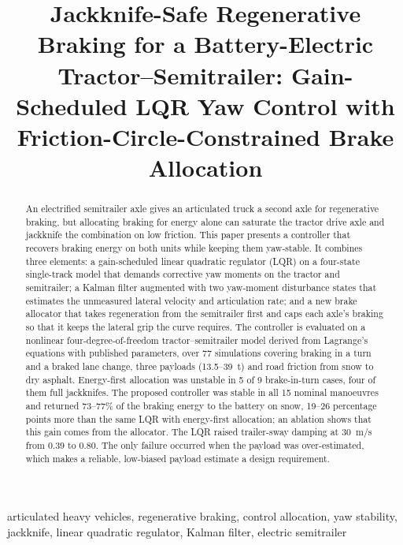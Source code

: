 \documentclass[conference]{IEEEtran}
\begin{document}
\title{Jackknife-Safe Regenerative Braking for a Battery-Electric Tractor--Semitrailer: Gain-Scheduled LQR Yaw Control with Friction-Circle-Constrained Brake Allocation}

\author{
}

\maketitle

\begin{abstract}
An electrified semitrailer axle gives an articulated truck a second axle for regenerative braking, but allocating braking for energy alone can saturate the tractor drive axle and jackknife the combination on low friction. This paper presents a controller that recovers braking energy on both units while keeping them yaw-stable. It combines three elements: a gain-scheduled linear quadratic regulator (LQR) on a four-state single-track model that demands corrective yaw moments on the tractor and semitrailer; a Kalman filter augmented with two yaw-moment disturbance states that estimates the unmeasured lateral velocity and articulation rate; and a new brake allocator that takes regeneration from the semitrailer first and caps each axle's braking so that it keeps the lateral grip the curve requires. The controller is evaluated on a nonlinear four-degree-of-freedom tractor--semitrailer model derived from Lagrange's equations with published parameters, over 77 simulations covering braking in a turn and a braked lane change, three payloads (13.5--39~t) and road friction from snow to dry asphalt. Energy-first allocation was unstable in 5 of 9 brake-in-turn cases, four of them full jackknifes. The proposed controller was stable in all 15 nominal manoeuvres and returned 73--77\% of the braking energy to the battery on snow, 19--26 percentage points more than the same LQR with energy-first allocation; an ablation shows that this gain comes from the allocator. The LQR raised trailer-sway damping at 30~m/s from 0.39 to 0.80. The only failure occurred when the payload was over-estimated, which makes a reliable, low-biased payload estimate a design requirement.
\end{abstract}

\begin{IEEEkeywords}
articulated heavy vehicles, regenerative braking, control allocation, yaw stability, jackknife, linear quadratic regulator, Kalman filter, electric semitrailer
\end{IEEEkeywords}
\end{document}
